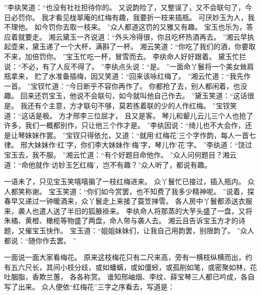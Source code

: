 ”李纨笑道：“也没有社社担待你的。
又说韵险了，又整误了，又不会联句了，今日必罚你。
我才看见栊翠庵的红梅有趣，我要折一枝来插瓶。
可厌妙玉为人，我不理他。
如今罚你去取一枝来。
”众人都道这罚的又雅又有趣。
宝玉也乐为，答应着就要走。
湘云黛玉一齐说道：“外头冷得很，你且吃杯热酒再去。
”湘云早执起壶来，黛玉递了一个大杯，满斟了一杯。
湘云笑道：“你吃了我们的酒，你要取不来，加倍罚你。
”宝玉忙吃一杯，冒雪而去。
李纨命人好好跟着。
黛玉忙拦说：“不必，有了人反不得了。
”李纨点头说：“是。
”一面命丫鬟将一个美女耸肩瓶拿来，
贮了水准备插梅，因又笑道：“回来该咏红梅了。
”湘云忙道：“我先作一首。
”宝钗忙道：“今日断乎不容你再作了。
你都抢了去，别人都闲着，也没趣。
回来还罚宝玉，他说不会联句，如今就叫他自己作去。
”黛玉笑道：“这话很是。
我还有个主意，方才联句不够，莫若拣着联的少的人作红梅。
”宝钗笑道：“这话是极。
方才邢李三位屈才，
且又是客。
琴儿和颦儿云儿三个人也抢了许多，我们一概都别作，只让他三个作才是。
”李纨因说：“绮儿也不大会作，还是让琴妹妹作罢。
”宝钗只得依允，又道：“就用‘红梅花’三个字作韵，每人一首七律。
邢大妹妹作‘红’字，你们李大妹妹作‘梅’字，琴儿作‘花’字。
”李纨道：“饶过宝玉去，我不服。
”湘云忙道：“有个好题目命他作。
”众人问何题目？湘云道：“命他就作‘访妙玉乞红梅’，岂不有趣？”众人听了，都说有趣。
\par
一语未了，只见宝玉笑嘻嘻掮了一枝红梅进来。
众丫鬟忙已接过，插入瓶内。
众人都笑称谢。
宝玉笑道：“你们如今赏罢，也不知费了我多少精神呢。
”说着，探春早又递过一钟暖酒来，众丫鬟走上来接了蓑笠掸雪。
各人房中丫鬟都添送衣服来，袭人也遣人送了半旧的狐腋褂来。
李纨命人将那蒸的大芋头盛了一盘，又将朱橘、黄橙、橄榄等物盛了两盘，命人带与袭人去。
湘云且告诉宝玉方才的诗题，又催宝玉快作。
宝玉道：“姐姐妹妹们，让我自己用韵罢，别限韵了。
”众人都说：“随你作去罢。
”\par
一面说一面大家看梅花。
原来这枝梅花只有二尺来高，旁有一横枝纵横而出，约有五六尺长，其间小枝分歧，或如蟠螭，或如僵蚓，或孤削如笔，或密聚如林，花吐胭脂，香欺兰蕙，
各各称赏。
谁知邢岫烟、李纹、薛宝琴三人都已吟成，各自写了出来。
众人便依“红梅花”三字之序看去，写道是：\par

